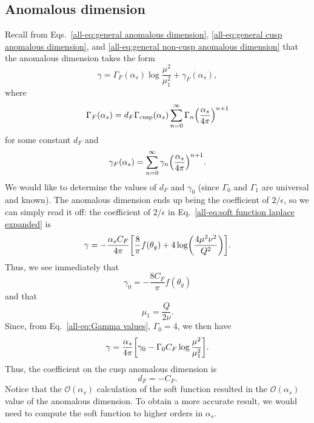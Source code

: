 \documentclass[../thesis.tex]{subfiles}
\providecommand{\cusp}{\mathrm{cusp}}
\providecommand{\cO}{\mathcal{O}}
\begin{document}
\subsection{Anomalous dimension}
	Recall from Eqs.~\ref{all-eq:general anomalous dimension}, \ref{all-eq:general cusp anomalous dimension}, and \ref{all-eq:general non-cusp anomalous dimension} that the anomalous dimension takes the form
	\begin{equation}
		\gamma = \Gamma_F(\alpha_s) \log\frac{\mu^2}{\mu_1^2} + \gamma_F(\alpha_s),
	\end{equation}
	where
	\begin{equation}
		\Gamma_F(\alpha_s) = d_F \Gamma_\cusp(\alpha_s) \sum_{n = 0}^\infty \Gamma_n \qty(\frac{\alpha_s}{4\pi})^{n + 1}
	\end{equation}
	for some constant $d_F$ and
	\begin{equation}
		\gamma_F(\alpha_s) = \sum_{n = 0}^\infty \gamma_n \qty(\frac{\alpha_s}{4\pi})^{n + 1}.
	\end{equation}
	We would like to determine the values of $d_F$ and $\gamma_0$ (since $\Gamma_0$ and $\Gamma_1$ are universal and known). The anomalous dimension ends up being the coefficient of $2/\epsilon$, so we can simply read it off: the coefficient of $2/\epsilon$ in Eq.~\ref{all-eq:soft function laplace expanded} is
	\begin{equation}
		\gamma = -\frac{\alpha_s C_F}{4\pi}\qty[\frac{8}{\pi} f(\theta_g) + 4\log(\frac{4\mu^2 \nu^2}{Q^2})].
	\end{equation}
	Thus, we see immediately that
	\begin{equation}\label{all-eq:gamma 0 value}
	\boxed{
		\gamma_0 = -\frac{8 C_F}{\pi}f(\theta_g)
	}
	\end{equation}
	and that
	\begin{equation}\label{all-eq:mu 1 value}
	\boxed{
		\mu_1 = \frac{Q}{2\nu}.
	}
	\end{equation}
	Since, from Eq.~\ref{all-eq:Gamma values}, $\Gamma_0 = 4$, we then have
	\begin{equation}
		\gamma = \frac{\alpha_s}{4\pi}\qty[\gamma_0 - \Gamma_0 C_F \log\frac{\mu^2}{\mu_1^2}].
	\end{equation}
	Thus, the coefficient on the cusp anomalous dimension is
	\begin{equation}
		\boxed{d_F = -C_F.}
	\end{equation}
	Notice that the $\cO(\alpha_s)$ calculation of the soft function resulted in the $\cO(\alpha_s)$ value of the anomalous dimension. To obtain a more accurate result, we would need to compute the soft function to higher orders in $\alpha_s$.
\end{document}
